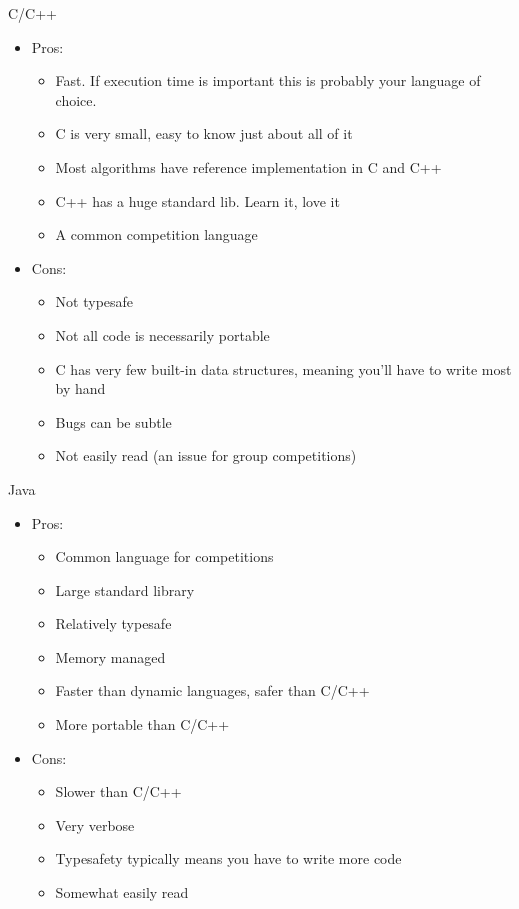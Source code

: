 \documentclass{beamer}
\begin{document}
\begin{frame}{C/C++}
  \begin{centering}
    \begin{itemize}
      \item Pros:
      \begin{itemize}
        \item Fast. If execution time is important this is probably your language of choice.
        \item C is very small, easy to know just about all of it
        \item Most algorithms have reference implementation in C and C++
        \item C++ has a huge standard lib. Learn it, love it
        \item A common competition language
      \end{itemize}
      \item Cons:
      \begin{itemize}
        \item Not typesafe
        \item Not all code is necessarily portable
        \item C has very few built-in data structures, meaning you'll have to write most by hand
        \item Bugs can be subtle
        \item Not easily read (an issue for group competitions)
      \end{itemize}
    \end{itemize}
  \end{centering}
\end{frame}



\begin{frame}{Java}
  \begin{centering}
    \begin{itemize}
      \item Pros:
      \begin{itemize}
        \item Common language for competitions
        \item Large standard library
        \item Relatively typesafe
        \item Memory managed
        \item Faster than dynamic languages, safer than C/C++
        \item More portable than C/C++
      \end{itemize}
      \item Cons:
      \begin{itemize}
        \item Slower than C/C++
        \item Very verbose
        \item Typesafety typically means you have to write more code
        \item Somewhat easily read
      \end{itemize}
    \end{itemize}
  \end{centering}
\end{frame}
\end{document}
